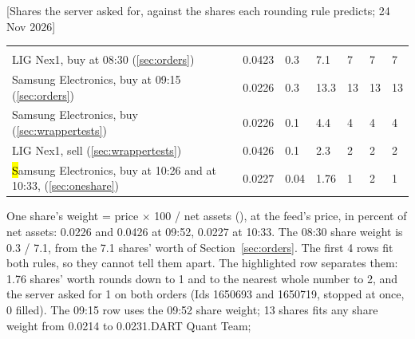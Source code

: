 [Shares the server asked for, against the shares each rounding rule predicts; 24 Nov 2026]{%
{\tabfont\begin{tabularx}{\linewidth}{>{\RaggedRight\arraybackslash}X R{15mm} R{9mm} R{12mm} R{12mm} R{14mm} R{12mm}}
 &  &  &  &  &  & \\
LIG Nex1, buy at 08:30 (\ref{sec:orders}) & 0.0423 & 0.3 & 7.1 & 7 & 7 & 7\\\rowsep
Samsung Electronics, buy at 09:15 (\ref{sec:orders}) & 0.0226 & 0.3 & 13.3 & 13 & 13 & 13\\\rowsep
Samsung Electronics, buy (\ref{sec:wrappertests}) & 0.0226 & 0.1 & 4.4 & 4 & 4 & 4\\\rowsep
LIG Nex1, sell (\ref{sec:wrappertests}) & 0.0426 & 0.1 & 2.3 & 2 & 2 & 2\\\rowsep
\hl Samsung Electronics, buy at 10:26 and at 10:33,  (\ref{sec:oneshare}) & 0.0227 & 0.04 & 1.76 & 1 & 2 & 1\\
\end{tabularx}}}{One share's weight = price $\times$ 100 / net assets (), at the feed's price, in percent of net assets: 0.0226 and 0.0426 at 09:52, 0.0227 at 10:33. The 08:30 share weight is 0.3 / 7.1, from the 7.1 shares' worth of Section~\ref{sec:orders}. The first 4 rows fit both rules, so they cannot tell them apart. The highlighted row separates them: 1.76 shares' worth rounds down to 1 and to the nearest whole number to 2, and the server asked for 1 on both orders (Ids 1650693 and 1650719, stopped at once, 0 filled). The 09:15 row uses the 09:52 share weight; 13 shares fits any share weight from 0.0214 to 0.0231.}{DART Quant Team; }

